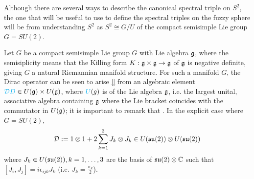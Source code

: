 
\linea

Although there are several ways to describe the canonical spectral triple on  $S^2$, the one that will be useful to use to define the spectral triples on the fuzzy sphere will be from understanding $S^2$ as  $S^2 \cong G/U$ of the compact semisimple Lie group $G = SU(2)$.

Let $G$ be a compact semisimple Lie group $G$ with Lie algebra $\mathfrak{g}$, where the semisiplicity means that the Killing form $K: \mathfrak{g} \times \mathfrak{g} \to \mathfrak{g}$ of $\mathfrak{g}$ is negative definite, giving $G$ a natural Riemannian manifold structure. For such a manifold $G$, the Dirac operator can be seen to arise \ref{} from an algebraic element $\textcolor{cyan}{\mathcal D D} \in U(\mathfrak{g})\times U(\mathfrak{g})$, where $\textcolor{cyan}{U}(g)$ is  of the Lie algebra $\mathfrak{g}$, i.e. the largest  unital, associative algebra containing $\mathfrak{g}$ where the Lie bracket coincides with the commutator in $U(\mathfrak{g})$; it is important to remark that . In the explicit case where $G = SU(2)$,
\begin{equation}
    \mathcal D := 1 \otimes 1 + 2 \sum_{k = 1}^3 J_k \otimes J_k \in U(\mathfrak{su}(2)) \otimes U(\mathfrak{su}(2))
\end{equation}
where $J_k \in U(\mathfrak{su}(2)), k = 1, \dots, 3$ are the basis of $\mathfrak{su}(2)\otimes \mathbb{C}$ such that $[J_i, J_j] = i \epsilon_{ijk} J_k$ (i.e. $J_k = \frac{\sigma_k}{2}$). 

